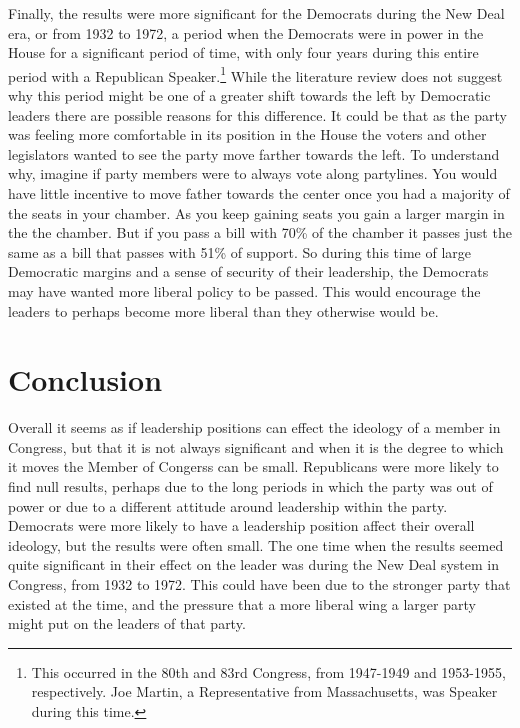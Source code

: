 \documentclass[12pt,twoside]{reedthesis}
\begin{document}
  Finally, the results were more significant for the Democrats during the
  New Deal era, or from 1932 to 1972, a period when the Democrats were in
  power in the House for a significant period of time, with only four
  years during this entire period with a Republican
  Speaker.\footnote{This occurred in the 80th and 83rd Congress, from 1947-1949 and 1953-1955, respectively. Joe Martin, a Representative from Massachusetts, was Speaker during this time.}
  While the literature review does not suggest why this period might be
  one of a greater shift towards the left by Democratic leaders there are
  possible reasons for this difference. It could be that as the party was
  feeling more comfortable in its position in the House the voters and
  other legislators wanted to see the party move farther towards the left.
  To understand why, imagine if party members were to always vote along
  partylines. You would have little incentive to move father towards the
  center once you had a majority of the seats in your chamber. As you keep
  gaining seats you gain a larger margin in the the chamber. But if you
  pass a bill with 70\% of the chamber it passes just the same as a bill
  that passes with 51\% of support. So during this time of large
  Democratic margins and a sense of security of their leadership, the
  Democrats may have wanted more liberal policy to be passed. This would
  encourage the leaders to perhaps become more liberal than they otherwise
  would be.
  
  \section{Conclusion}\label{conclusion-1}
  
  Overall it seems as if leadership positions can effect the ideology of a
  member in Congress, but that it is not always significant and when it is
  the degree to which it moves the Member of Congerss can be small.
  Republicans were more likely to find null results, perhaps due to the
  long periods in which the party was out of power or due to a different
  attitude around leadership within the party. Democrats were more likely
  to have a leadership position affect their overall ideology, but the
  results were often small. The one time when the results seemed quite
  significant in their effect on the leader was during the New Deal system
  in Congress, from 1932 to 1972. This could have been due to the stronger
  party that existed at the time, and the pressure that a more liberal
  wing a larger party might put on the leaders of that party.
  
\end{document}

